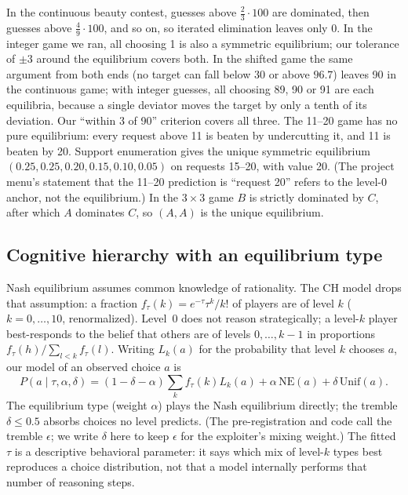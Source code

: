 \documentclass[11pt]{article}
\begin{document}
In the continuous beauty contest, guesses above $\tfrac23\cdot100$ are dominated, then guesses above $\tfrac49\cdot100$, and so on, so iterated elimination leaves only 0. In the integer game we ran, all choosing 1 is also a symmetric equilibrium; our tolerance of $\pm3$ around the equilibrium covers both. In the shifted game the same argument from both ends (no target can fall below 30 or above $96.7$) leaves 90 in the continuous game; with integer guesses, all choosing 89, 90 or 91 are each equilibria, because a single deviator moves the target by only a tenth of its deviation. Our ``within 3 of 90'' criterion covers all three. The 11--20 game has no pure equilibrium: every request above 11 is beaten by undercutting it, and 11 is beaten by 20. Support enumeration gives the unique symmetric equilibrium $(0.25, 0.25, 0.20, 0.15, 0.10, 0.05)$ on requests 15--20, with value 20. (The project menu's statement that the 11--20 prediction is ``request 20'' refers to the level-0 anchor, not the equilibrium.) In the $3{\times}3$ game $B$ is strictly dominated by $C$, after which $A$ dominates $C$, so $(A,A)$ is the unique equilibrium.

\subsection{Cognitive hierarchy with an equilibrium type}
Nash equilibrium assumes common knowledge of rationality. The CH model drops that assumption: a fraction $f_\tau(k)=e^{-\tau}\tau^k/k!$ of players are of level $k$ ($k=0,\dots,10$, renormalized). Level~0 does not reason strategically; a level-$k$ player best-responds to the belief that others are of levels $0,\dots,k-1$ in proportions $f_\tau(h)/\sum_{l<k}f_\tau(l)$. Writing $L_k(a)$ for the probability that level $k$ chooses $a$, our model of an observed choice $a$ is
\begin{equation}\label{eq:model}
P(a\mid\tau,\alpha,\delta)=(1-\delta-\alpha)\sum_{k}f_\tau(k)L_k(a)+\alpha\,\mathrm{NE}(a)+\delta\,\mathrm{Unif}(a).
\end{equation}
The equilibrium type (weight $\alpha$) plays the Nash equilibrium directly; the tremble $\delta\le0.5$ absorbs choices no level predicts. (The pre-registration and code call the tremble $\epsilon$; we write $\delta$ here to keep $\epsilon$ for the exploiter's mixing weight.) The fitted $\tau$ is a descriptive behavioral parameter: it says which mix of level-$k$ types best reproduces a choice distribution, not that a model internally performs that number of reasoning steps.
\end{document}
